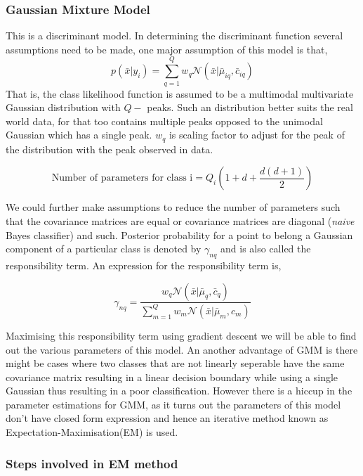  
 \subsubsection*{Gaussian Mixture Model}
 
 This is a discriminant model. In determining the discriminant function several assumptions need to be made, one major assumption of this model is that,
 \[
 p(\bar{x}|y_i) = \sum_{q=1}^{Q} w_q \mathcal{N}(\bar{x}|\bar{\mu}_{iq},\bar{c}_{iq})
 \]
 That is, the class likelihood function is assumed to be a multimodal multivariate Gaussian distribution with $Q-$ peaks. Such an distribution better suits the real world data, for that too contains multiple peaks opposed to the unimodal Gaussian which has a single peak. $w_q$ is scaling factor to adjust for the peak of the distribution with the peak observed in data. 
 
 \[\text{Number of parameters for class i} = Q_i\left(1 + d + \frac{d(d+1)}{2}\right)\]
 
  We could further make assumptions to reduce the number of parameters such that the covariance matrices are equal or covariance matrices are diagonal (\textit{naive} Bayes classifier) and such. Posterior probability for a point to belong a Gaussian component of a particular class is denoted by $\gamma_{nq}$ and is also called the responsibility term. An expression for the responsibility term is,
 
 \[ \gamma_{nq} = \frac{w_q\mathcal{N}(\bar{x}|\bar{\mu}_{q},\bar{c}_{q})}{\sum_{m=1}^{Q}w_m\mathcal{N}(\bar{x}|\bar{\mu}_{m},c_{m})} \]
 
 Maximising this responsibility term using gradient descent we will be able to find out the various parameters of this model. An another advantage of GMM is there might be cases where two classes that are not linearly seperable have the same covariance matrix resulting in a linear decision boundary while using a single Gaussian thus resulting in a poor classification. However there is a hiccup in the parameter estimations for GMM, as it turns out the parameters of this model don't have closed form expression and hence an iterative method known as Expectation-Maximisation(EM) is used.
 
 \newpage
 \subsubsection*{Steps involved in EM method}
 
